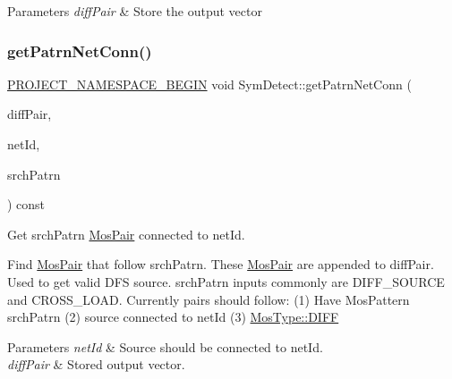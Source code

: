 \begin{DoxyParams}{Parameters}
{\em diff\+Pair} & Store the output vector \\
\hline
\end{DoxyParams}
\mbox{\label{classSymDetect_af7d1b22086aa98a27b1eafc9266596d8}} 
\subsubsection{\texorpdfstring{get\+Patrn\+Net\+Conn()}{getPatrnNetConn()}}
{\footnotesize\ttfamily \hyperlink{namespace_8h_ae48726a24dab2034454cf6d79e531eb8}{P\+R\+O\+J\+E\+C\+T\+\_\+\+N\+A\+M\+E\+S\+P\+A\+C\+E\+\_\+\+B\+E\+G\+IN} void Sym\+Detect\+::get\+Patrn\+Net\+Conn (\begin{DoxyParamCaption}\item[{std\+::vector$<$ \hyperlink{classMosPair}{Mos\+Pair} $>$ \&}]{diff\+Pair,  }\item[{\hyperlink{type_8h_a581e8093e28e7362f2b6937296190676}{Index\+Type}}]{net\+Id,  }\item[{\hyperlink{type_8h_af19eddb079bfea723256710b029c38e8}{Mos\+Pattern}}]{srch\+Patrn }\end{DoxyParamCaption}) const\hspace{0.3cm}{\ttfamily [private]}}



Get srch\+Patrn \hyperlink{classMosPair}{Mos\+Pair} connected to net\+Id. 

Find \hyperlink{classMosPair}{Mos\+Pair} that follow srch\+Patrn. These \hyperlink{classMosPair}{Mos\+Pair} are appended to diff\+Pair. Used to get valid D\+FS source. srch\+Patrn inputs commonly are D\+I\+F\+F\+\_\+\+S\+O\+U\+R\+CE and C\+R\+O\+S\+S\+\_\+\+L\+O\+AD. Currently pairs should follow\+: (1) Have Mos\+Pattern srch\+Patrn (2) source connected to net\+Id (3) \hyperlink{type_8h_a34a6a66323cfecf83dfe00bc8fd96333aa2e1ec2dd3d8195d238c5494f0ac5578}{Mos\+Type\+::\+D\+I\+FF}


\begin{DoxyParams}{Parameters}
{\em net\+Id} & Source should be connected to net\+Id. \\
\hline
{\em diff\+Pair} & Stored output vector. \\
\hline
\end{DoxyParams}
\mbox{\label{classSymDetect_a48c23173bf5e56c3aa11ac306715cba2}} 
